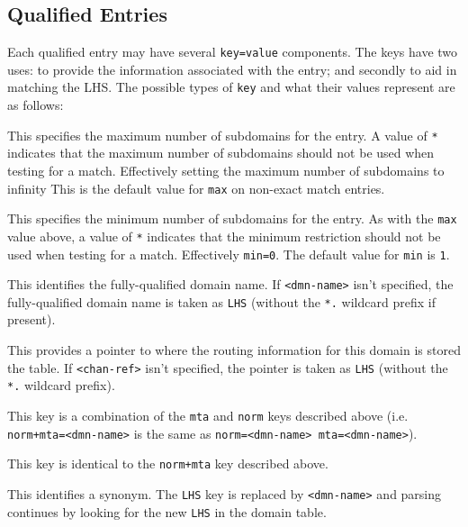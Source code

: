 \subsection*{Qualified Entries}

Each qualified entry may have several \verb+key=value+ components.
The keys have two uses: to provide the information associated with the
entry; and secondly to aid in matching the LHS.
The possible types of \verb+key+ and what their values represent are
as follows:
\begin{describe}

\item[\protect{\verb|max=<number>|}:]
This specifies the maximum number of subdomains for the entry.
A value of \verb+*+ indicates that the maximum number of subdomains
should not be used when testing for a match.
Effectively setting the maximum number of subdomains to infinity
This is the default value for \verb+max+ on non-exact match entries.

\item[\protect{\verb|min=<number>|}:]
This specifies the minimum number of subdomains for the entry.
As with the \verb+max+ value above, a value of \verb+*+ indicates that
the minimum restriction should not be used when testing for a match.
Effectively \verb|min=0|. The default value for \verb+min+ is \verb+1+.

\item[\protect{\verb+norm=<dmn-name>+}:]
This identifies the fully-qualified domain name.
If \verb+<dmn-name>+ isn't specified, the fully-qualified domain name
is taken as \verb+LHS+ (without the \verb+*.+ wildcard prefix if present).

\item[\protect{\verb+mta=<chan-ref>+}:]
This provides a pointer to where the routing information for this
domain is stored the  table.
If \verb+<chan-ref>+ isn't specified, the pointer is taken as
\verb+LHS+ (without the \verb+*.+ wildcard prefix).

\item[\protect{\verb|norm+mta=<dmn-name>|}:]
This key is a combination of the \verb+mta+ and
\verb+norm+ keys described above (i.e. \verb|norm+mta=<dmn-name>| is
the same as \verb|norm=<dmn-name> mta=<dmn-name>|).

\item[\protect{\verb|mta+norm=<dmn-name>|}:]
This key is identical to the \verb|norm+mta| key described above.

\item[\protect{\verb+synonym=<dmn-name>+}:]
This identifies a synonym. The \verb|LHS| key is replaced by
\verb+<dmn-name>+ and parsing continues by looking for the new
\verb|LHS| in the domain table.


\end{describe}
